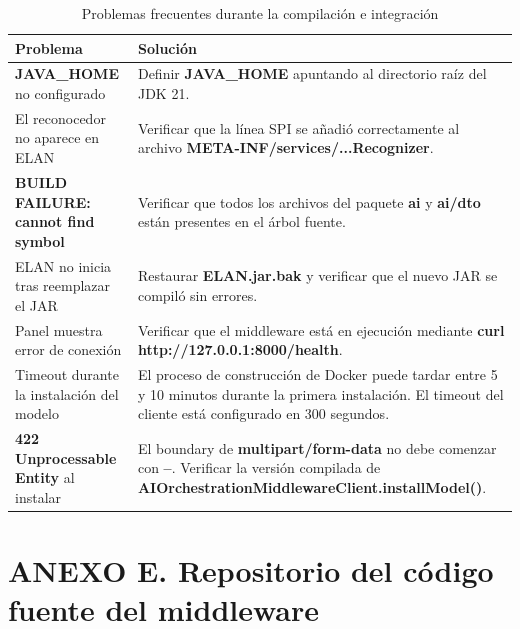 \begin{table}[H]
\centering
\caption{Problemas frecuentes durante la compilación e integración}
\label{tab:troubleshooting}
\scriptsize
\renewcommand{\arraystretch}{1.08}
\setlength{\tabcolsep}{4pt}

\begin{tabular}{
    >{\raggedright\arraybackslash}p{4.7cm}
    >{\raggedright\arraybackslash}p{8.4cm}
}
\toprule
\textbf{Problema} & \textbf{Solución} \\
\midrule
\textbf{JAVA\_HOME} no configurado &
Definir \textbf{JAVA\_HOME} apuntando al directorio raíz del JDK 21. \\

El reconocedor no aparece en ELAN &
Verificar que la línea SPI se añadió correctamente al archivo \textbf{META-INF/services/...Recognizer}. \\

\textbf{BUILD FAILURE: cannot find symbol} &
Verificar que todos los archivos del paquete \textbf{ai} y \textbf{ai/dto} están presentes en el árbol fuente. \\

ELAN no inicia tras reemplazar el JAR &
Restaurar \textbf{ELAN.jar.bak} y verificar que el nuevo JAR se compiló sin errores. \\

Panel muestra error de conexión &
Verificar que el middleware está en ejecución mediante \textbf{curl http://127.0.0.1:8000/health}. \\

Timeout durante la instalación del modelo &
El proceso de construcción de Docker puede tardar entre 5 y 10 minutos durante la primera instalación. El timeout del cliente está configurado en 300 segundos. \\

\textbf{422 Unprocessable Entity} al instalar &
El boundary de \textbf{multipart/form-data} no debe comenzar con \textbf{--}. Verificar la versión compilada de \textbf{AIOrchestrationMiddlewareClient.installModel()}. \\
\bottomrule
\end{tabular}
\end{table}


\section*{\normalfont ANEXO E. Repositorio del código fuente del middleware}
\label{anx:repo_middleware}


